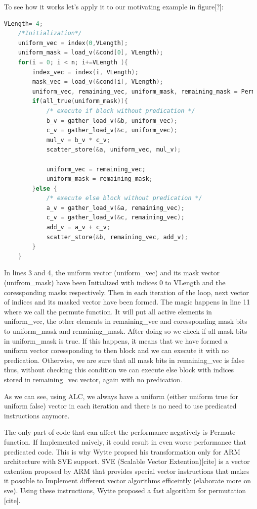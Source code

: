 \documentclass[\main/thesis.tex]{subfiles}
\begin{document}
To see how it works let's apply it to our motivating example in figure[?]:
\begin{lstlisting}[language=C]
    VLength= 4;
    /*Initialization*/
    uniform_vec = index(0,VLength);
    uniform_mask = load_v(&cond[0], VLength);
    for(i = 0; i < n; i+=VLength ){
        index_vec = index(i, VLength);
        mask_vec = load_v(&cond[i], VLength);
        uniform_vec, remaining_vec, uniform_mask, remaining_mask = Permute(uniform_vec, index_vec, uniform_mask, mask_vec);        
        if(all_true(uniform_mask)){
            /* execute if block without predication */
            b_v = gather_load_v(&b, uniform_vec);
            c_v = gather_load_v(&c, uniform_vec);
            mul_v = b_v * c_v;
            scatter_store(&a, uniform_vec, mul_v);

            uniform_vec = remaining_vec;
            uniform_mask = remaining_mask;
        }else {     
            /* execute else block without predication */
            a_v = gather_load_v(&a, remaining_vec);
            c_v = gather_load_v(&c, remaining_vec);
            add_v = a_v + c_v;
            scatter_store(&b, remaining_vec, add_v);
        } 
    }
\end{lstlisting}

In lines 3 and 4, the uniform vector (uniform\_vec) and its mask vector (unifrom\_mask) have been Initialized with indices 0 to VLength and the coressponding masks respectively.
Then in each iteration of the loop, next vector of indices and its masked vector have been formed. The magic happens in line 11 where we call the permute function. It will put all active elements in uniform\_vec, the other elements in remaining\_vec and coressponding mask bits to uniform\_mask and remaining\_mask.
After doing so we check if all mask bits in uniform\_mask is true. If this happens, it means that we have formed a uniform vector coressponding to then block and we can execute it with no predication. Otherwise, we are sure that all mask bits in remaining\_vec is false thus, without checking this condition we can 
execute else block with indices stored in remaining\_vec vector, again with no predication.

As we can see, using ALC, we always have a uniform (either uniform true for uniform false) vector in each iteration and there is no need to use predicated instructions anymore. 

The only part of code that can affect the performance negatively is Permute function. If Implemented naively, it could result in even worse performance that predicated code. This is why Wytte propsed his transformation only for ARM architecture with SVE support. SVE (Scalable Vector Extention)[cite] is a vector extention
proposed by ARM that provides special vector instructions that makes it possible to Implement different vector algorithms efficeintly (elaborate more on sve). Using these instructions, Wytte proposed a fast algorithm for permutation [cite].
\end{document}
